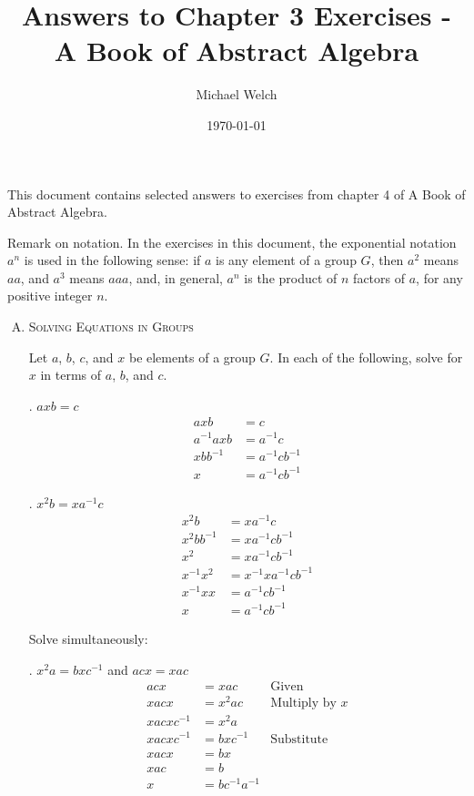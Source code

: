 \documentclass[twoside]{amsart}
\begin{document}
\title{Answers to Chapter 3 Exercises - A Book of Abstract Algebra}
\author{Michael Welch}
\date{\today}
\maketitle

This document contains selected answers to exercises from chapter 4
of A Book of Abstract Algebra.

Remark on notation. In the exercises in this document, the exponential
notation $a^n$ is used in the following sense: if $a$ is any element of
a group $G$, then $a^2$ means $aa$, and $a^3$ means $aaa$, and, in
general, $a^n$ is the product of $n$ factors of $a$, for any positive
integer $n$.

\begin{enumerate}[A.]
   \item \textsc{Solving Equations in Groups}

   \noindent Let $a$, $b$, $c$, and $x$ be elements of a group $G$. In each of
   the following, solve for $x$ in terms of $a$, $b$, and $c$.

   . $axb = c$
      \begin{align*}
         axb & = c \\
	 a^{-1}axb & = a^{-1}c \\
	 xbb^{-1} & = a^{-1}cb^{-1} \\
	 x & = a^{-1}cb^{-1}
      \end{align*}

   . $x^2b = xa^{-1}c$
      \begin{align*}
         x^2b & = xa^{-1}c    \\
	 x^2bb^{-1} & = xa^{-1}cb^{-1} \\
	 x^2        & = xa^{-1}cb^{-1} \\
	 x^{-1}x^2  & = x^{-1}xa^{-1}cb^{-1}\\
	 x^{-1}xx   & = a^{-1}cb^{-1} \\
	 x          & = a^{-1}cb^{-1}
      \end{align*}

   Solve simultaneously:

   . $x^2a = bxc^{-1}$ and $acx = xac$
   \begin{align*}
      acx & = xac      & \text{Given} \\
      xacx & = x^2ac   & \text{Multiply by $x$} \\
      xacxc^{-1} & = x^2a \\
      xacxc^{-1} & = bxc^{-1} & \text{Substitute} \\
      xacx       & = bx  \\
      xac        & = b  \\
      x          & = bc^{-1}a^{-1}
   \end{align*}



\end{enumerate}
\end{document}
